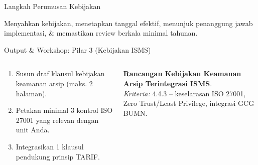 \documentclass[aspectratio=169,11pt]{beamer}
\begin{document}
\begin{frame}{Langkah Perumusan Kebijakan}
    \vspace{0.2cm}
    \centering
    
    \vspace{0.3cm}
    \begin{premiumbox}
        \small
        Menyahkan kebijakan, menetapkan tanggal efektif, menunjuk penanggung jawab implementasi, \& memastikan review berkala minimal tahunan.
    \end{premiumbox}
\end{frame}

\begin{frame}{Output \& Workshop: Pilar 3 (Kebijakan ISMS)}
    \vspace{0.2cm}
    \begin{columns}[T]
        \begin{premiumbox}
            \scriptsize
            \begin{enumerate}
                \item Susun draf klausul kebijakan keamanan arsip (maks. 2 halaman).
                \item Petakan minimal 3 kontrol ISO 27001 yang relevan dengan unit Anda.
                \item Integrasikan 1 klausul pendukung prinsip TARIF.
            \end{enumerate}
        \end{premiumbox}
        
        \begin{greenbox}[Portofolio 3]
            \scriptsize
            \textbf{Rancangan Kebijakan Keamanan Arsip Terintegrasi ISMS}.\\[0.1cm]
            \textit{Kriteria:} 4.4.3 -- keselarasan ISO 27001, Zero Trust/Least Privilege, integrasi GCG BUMN.
        \end{greenbox}
    \end{columns}
\end{frame}
\end{document}
